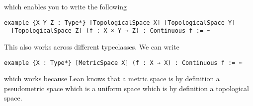 which enables you to write the following

\begin{lstlisting}
example {X Y Z : Type*} [TopologicalSpace X] [TopologicalSpace Y]
  [TopologicalSpace Z] (f : X × Y → Z) : Continuous f := ⋯
\end{lstlisting}

This also works across different typeclasses. 
We can write 

\begin{lstlisting}
example {X : Type*} [MetricSpace X] (f : X → X) : Continuous f := ⋯
\end{lstlisting}

which works because Lean knows that a metric space is by definition a pseudometric space which is a uniform space which is by definition a topological space.